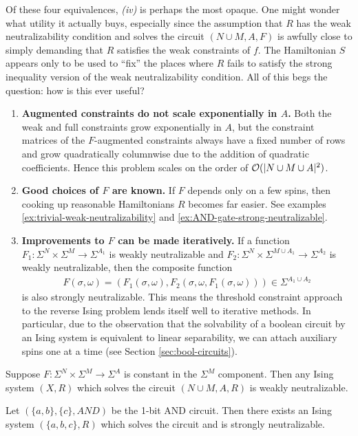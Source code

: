 \documentclass{article}
\begin{document}
\begin{rmk}
  Of these four equivalences, \emph{(iv)} is perhaps the most opaque. One might wonder what utility it actually buys, especially since the assumption that $R$ has the weak neutralizability condition and solves the circuit $(N\cup M, A, F)$ is awfully close to simply demanding that $R$ satisfies the weak constraints of $f$. The Hamiltonian $S$ appears only to be used to ``fix'' the places where $R$ fails to satisfy the strong inequality version of the weak neutralizability condition. All of this begs the question: how is this ever useful?

  \begin{enumerate}
    \item \textbf{Augmented constraints do not scale exponentially in $A$.} Both the weak and full constraints grow exponentially in $A$, but the constraint matrices of the $F$-augmented constraints always have a fixed number of rows and grow quadratically columnwise due to the addition of quadratic coefficients. Hence this problem scales on the order of $\mathcal{O}(|N \cup M \cup A|^2)$.
    \item \textbf{Good choices of $F$ are known.} If $F$ depends only on a few spins, then cooking up reasonable Hamiltonians $R$ becomes far easier. See examples \ref{ex:trivial-weak-neutralizability} and \ref{ex:AND-gate-strong-neutralizable}.
    \item \textbf{Improvements to $F$ can be made iteratively.} If a function $F_1:\Sigma^N \times \Sigma^M \to \Sigma^{A_1}$ is weakly neutralizable and $F_2:\Sigma^N\times \Sigma^{M\cup A_1} \to \Sigma^{A_2}$ is weakly neutralizable, then the composite function
      \begin{align*}
        F(\sigma, \omega) = (F_1(\sigma, \omega), F_2(\sigma, \omega, F_1(\sigma, \omega))) \in \Sigma^{A_1 \cup A_2}
      \end{align*}
      is also strongly neutralizable. This means the threshold constraint approach to the reverse Ising problem lends itself well to iterative methods. In particular, due to the observation that the solvability of a boolean circuit by an Ising system is equivalent to linear separability, we can attach auxiliary spins one at a time (see Section \ref{sec:bool-circuits}).
  \end{enumerate}
\end{rmk}

\begin{example}\label{ex:trivial-weak-neutralizability}
  Suppose $F:\Sigma^N \times \Sigma^M \to \Sigma^A$ is constant in the $\Sigma^M$ component. Then any Ising system $(X, R)$ which solves the circuit $(N\cup M, A, R)$ is weakly neutralizable.
\end{example}
\begin{example}\label{ex:AND-gate-strong-neutralizable}
  Let $(\{a,b\}, \{c\}, AND)$ be the 1-bit AND circuit. Then there exists an Ising system $(\{a,b,c\}, R)$ which solves the circuit and is strongly neutralizable.
\end{example}
\end{document}
